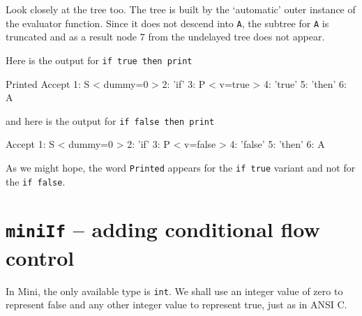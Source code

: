 Look closely at the tree too. The tree is built by the `automatic' outer instance of the evaluator function. Since it does not descend into {\tt A}, the subtree for {\tt A} is truncated and as a result node 7 from the undelayed tree does not appear.

Here is the output for {\tt if true then print}
\begin{codeblock}
Printed
Accept
1: S < dummy=0 >
  2: 'if'
  3: P < v=true >
    4: 'true'
  5: 'then'
  6: A
\end{codeblock}
and here is the output for {\tt if false then print}
\begin{codeblock}
Accept
1: S < dummy=0 >
  2: 'if'
  3: P < v=false >
    4: 'false'
  5: 'then'
  6: A
  \end{codeblock}

As we might hope, the word {\tt Printed} appears for the {\tt if true} variant and not for the {\tt if false}.
\clearpage
\section{{\tt miniIf} -- adding conditional flow control}
In Mini, the only available type is {\tt int}. We shall use an integer value of zero to represent false and any other integer value to represent true, just as in ANSI C.
 
